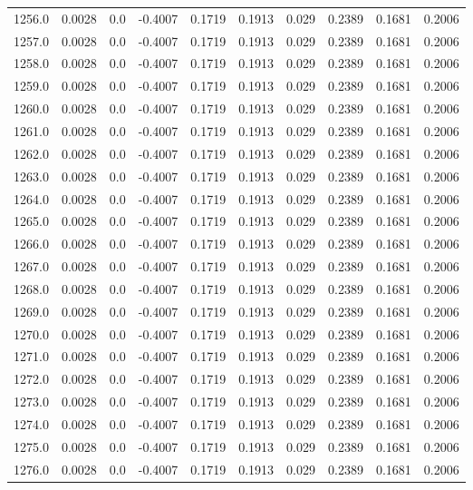 \begin{longtable}{lrrrrrrrrr}
1256.0 & 0.0028 & 0.0 & -0.4007 & 0.1719 & 0.1913 & 0.029 & 0.2389 & 0.1681 & 0.2006 \\
1257.0 & 0.0028 & 0.0 & -0.4007 & 0.1719 & 0.1913 & 0.029 & 0.2389 & 0.1681 & 0.2006 \\
1258.0 & 0.0028 & 0.0 & -0.4007 & 0.1719 & 0.1913 & 0.029 & 0.2389 & 0.1681 & 0.2006 \\
1259.0 & 0.0028 & 0.0 & -0.4007 & 0.1719 & 0.1913 & 0.029 & 0.2389 & 0.1681 & 0.2006 \\
1260.0 & 0.0028 & 0.0 & -0.4007 & 0.1719 & 0.1913 & 0.029 & 0.2389 & 0.1681 & 0.2006 \\
1261.0 & 0.0028 & 0.0 & -0.4007 & 0.1719 & 0.1913 & 0.029 & 0.2389 & 0.1681 & 0.2006 \\
1262.0 & 0.0028 & 0.0 & -0.4007 & 0.1719 & 0.1913 & 0.029 & 0.2389 & 0.1681 & 0.2006 \\
1263.0 & 0.0028 & 0.0 & -0.4007 & 0.1719 & 0.1913 & 0.029 & 0.2389 & 0.1681 & 0.2006 \\
1264.0 & 0.0028 & 0.0 & -0.4007 & 0.1719 & 0.1913 & 0.029 & 0.2389 & 0.1681 & 0.2006 \\
1265.0 & 0.0028 & 0.0 & -0.4007 & 0.1719 & 0.1913 & 0.029 & 0.2389 & 0.1681 & 0.2006 \\
1266.0 & 0.0028 & 0.0 & -0.4007 & 0.1719 & 0.1913 & 0.029 & 0.2389 & 0.1681 & 0.2006 \\
1267.0 & 0.0028 & 0.0 & -0.4007 & 0.1719 & 0.1913 & 0.029 & 0.2389 & 0.1681 & 0.2006 \\
1268.0 & 0.0028 & 0.0 & -0.4007 & 0.1719 & 0.1913 & 0.029 & 0.2389 & 0.1681 & 0.2006 \\
1269.0 & 0.0028 & 0.0 & -0.4007 & 0.1719 & 0.1913 & 0.029 & 0.2389 & 0.1681 & 0.2006 \\
1270.0 & 0.0028 & 0.0 & -0.4007 & 0.1719 & 0.1913 & 0.029 & 0.2389 & 0.1681 & 0.2006 \\
1271.0 & 0.0028 & 0.0 & -0.4007 & 0.1719 & 0.1913 & 0.029 & 0.2389 & 0.1681 & 0.2006 \\
1272.0 & 0.0028 & 0.0 & -0.4007 & 0.1719 & 0.1913 & 0.029 & 0.2389 & 0.1681 & 0.2006 \\
1273.0 & 0.0028 & 0.0 & -0.4007 & 0.1719 & 0.1913 & 0.029 & 0.2389 & 0.1681 & 0.2006 \\
1274.0 & 0.0028 & 0.0 & -0.4007 & 0.1719 & 0.1913 & 0.029 & 0.2389 & 0.1681 & 0.2006 \\
1275.0 & 0.0028 & 0.0 & -0.4007 & 0.1719 & 0.1913 & 0.029 & 0.2389 & 0.1681 & 0.2006 \\
1276.0 & 0.0028 & 0.0 & -0.4007 & 0.1719 & 0.1913 & 0.029 & 0.2389 & 0.1681 & 0.2006 \\

\end{longtable}
